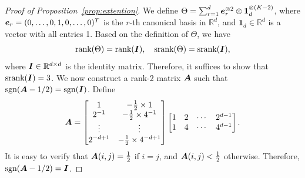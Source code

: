 \documentclass{article}
\theoremstyle{plain}
\newtheorem{prop}{Proposition}
\theoremstyle{definition}
\def\sign{\textup{sgn}}
\def\srank{\textup{srank}}
\def\rank{\textup{rank}}
\begin{document}
\clearpage
\begingroup
\let\clearpage\relax 
\onecolumn 
\begin{proof}[Proof of Proposition~\ref{prop:extention}]
We define $\Theta=\sum_{r=1}^d \bm{e}^{\otimes 2}_r\otimes \mathbf{1}^{\otimes (K-2)}_d$, where $\bm{e}_r=(0,\ldots,0,1,0,\ldots,0)^T$ is the $r$-th canonical basis in $\mathbb{R}^d$, and $\mathbf{1}_d\in\mathbb{R}^d$ is a vector with all entries 1. Based on the definition of $\Theta$, we have
\[
\rank(\Theta)=\rank(\mI),\quad \srank(\Theta)=\srank(\mI),
\]
where $\bm I\in\mathbb{R}^{d\times d}$ is the identity matrix. Therefore, it suffices to show that $\srank(\mI)=3$. We now construct a rank-2 matrix $\bm A$ such that $\sign(\mA-1/2)=\sign(\mI)$. Define
\[
\bm A=\begin{bmatrix}
1 & -{1\over 2}\times 1\\
2^{-1}& -{1\over 2}\times 4^{-1}\\
\vdots&\vdots\\
2^{-d+1}& -{1\over 2}\times 4^{-d+1}
\end{bmatrix}
\begin{bmatrix}
1&2&\cdots&2^{d-1}\\
1&4&\cdots& 4^{d-1}
\end{bmatrix}.
\]
It is easy to verify that $\bm A(i,j)={1\over 2}$ if $i=j$, and $\bm A(i,j)<{1\over 2}$ otherwise. Therefore, $\sign(\mA-1/2)=\mI$. 
\end{proof}
\end{document}
